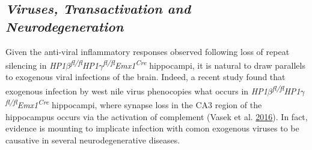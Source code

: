 \documentclass[onehalf,12pt]{beavtex}
\begin{document}
  \subsection*{\texorpdfstring{\emph{Viruses, Transactivation and
  Neurodegeneration}}{Viruses, Transactivation and Neurodegeneration}}\label{viruses-transactivation-and-neurodegeneration}
  
  Given the anti-viral inflammatory responses observed following loss of
  repeat silencing in
  \emph{HP1\(\beta\)\textsuperscript{fl/fl}HP1\(\gamma\)\textsuperscript{fl/fl}Emx1\textsuperscript{Cre}}
  hippocampi, it is natural to draw parallels to exogenous viral
  infections of the brain. Indeed, a recent study found that exogenous
  infection by west nile virus phenocopies what occurs in
  \emph{HP1\(\beta\)\textsuperscript{fl/fl}HP1\(\gamma\)\textsuperscript{fl/fl}Emx1\textsuperscript{Cre}}
  hippocampi, where synapse loss in the CA3 region of the hippocampus
  occurs via the activation of complement (Vasek et al.
  \protect\hyperlink{ref-Vasekcomplementmicroglialaxis2016}{2016}). In
  fact, evidence is mounting to implicate infection with comon exogenous
  viruses to be causative in several neurodegenerative diseases.
  
\end{document}
